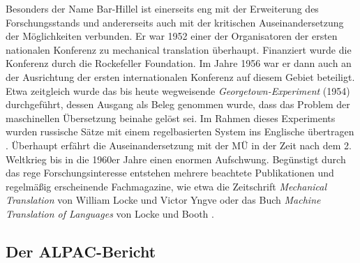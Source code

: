 \begin{sloppypar}
Besonders der Name Bar-Hillel ist einerseits eng mit der Erweiterung des Forschungsstands und andererseits auch mit der kritischen Auseinandersetzung der Möglichkeiten verbunden. Er war 1952 einer der Organisatoren der ersten nationalen Konferenz zu \glqq mechanical translation\grqq{} \citep[29]{delavenay_introduction_1960} überhaupt. Finanziert wurde die Konferenz durch die Rockefeller Foundation. Im Jahre 1956 war er dann auch an der Ausrichtung der ersten internationalen Konferenz auf diesem Gebiet beteiligt. Etwa zeitgleich wurde das bis heute wegweisende \emph{George\-town-Experiment} (1954) durchgeführt, dessen Ausgang als Beleg genommen wurde, dass das Problem der maschinellen Übersetzung beinahe gelöst sei. Im Rahmen dieses Experiments wurden russische Sätze mit einem regelbasierten System ins Englische übertragen \citep[15]{koehn_statistical_2009}. Überhaupt erfährt die Auseinandersetzung mit der MÜ in der Zeit nach dem 2.\,Weltkrieg bis in die 1960er Jahre einen enormen Aufschwung. Begünstigt durch das rege Forschungsinteresse entstehen mehrere beachtete Publikationen und regelmäßig erscheinende Fachmagazine, wie etwa die Zeitschrift \emph{Mechanical Translation} von William Locke und Victor Yngve oder das Buch \emph{Machine Translation of Languages} von Locke und Booth \citep[30]{delavenay_introduction_1960}.
\end{sloppypar}

\subsection{Der ALPAC-Bericht}
\label{K3:para:alpac}

